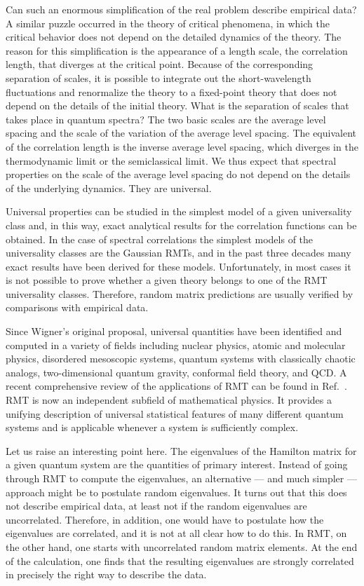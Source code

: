 Can such an enormous
simplification of the real problem describe
empirical data? A similar puzzle occurred in the theory of critical
phenomena, in which the critical behavior does not depend on the detailed
dynamics of the theory. The reason for this simplification is the
appearance of a length scale, the correlation length, that diverges
at the critical point.  Because of the corresponding separation of
scales, it is possible to integrate out the short-wavelength
fluctuations and renormalize the theory to a fixed-point theory that
does not depend on the details of the initial theory.  What is the
separation of scales that takes place in quantum spectra?  The two
basic scales are the average level spacing and the scale of the
variation of the average level spacing. The equivalent of the
correlation length is the inverse average level spacing, which diverges
in the thermodynamic limit or the semiclassical limit. We thus expect
that spectral properties on the scale of the average level spacing do
not depend on the details of the underlying dynamics. They are
universal.

Universal properties can be studied in the simplest model of a given
universality class and, in this way, exact analytical results for the
correlation functions can be obtained.  In the case of spectral
correlations the simplest models of the universality classes are the
Gaussian RMTs, and in the past three decades many
exact results have been derived for these models.  Unfortunately, in
most cases it is not possible to prove whether a given theory belongs
to one of the RMT universality classes.  Therefore,
random matrix predictions are usually verified by comparisons with
empirical data.

Since Wigner's original proposal, universal quantities have been
identified and computed in a variety of fields including nuclear
physics, atomic and molecular physics, disordered mesoscopic systems,
quantum systems with classically chaotic analogs, two-dimensional
quantum gravity, conformal field theory, and QCD.  A recent
comprehensive review of the applications of RMT can be found in
Ref.~\cite{Guhr98}.  RMT is now an independent subfield of
mathematical physics.  It provides a unifying description of universal
statistical features of many different quantum systems and is
applicable whenever a system is sufficiently complex.

Let us raise an interesting point here.
The eigenvalues of the Hamilton matrix for a given quantum
system are the quantities of primary interest.  Instead of going
through RMT to compute the eigenvalues, an 
alternative --- and much simpler --- approach might be to postulate
random eigenvalues.  It turns out that this does not describe
empirical data, at least not if the random eigenvalues are
uncorrelated.  Therefore, in addition, one would have to postulate how
the eigenvalues are correlated, and it is not at all clear how to do
this.  In RMT, on the other hand, one starts with
uncorrelated random matrix elements.  At the end of the calculation,
one finds that the resulting eigenvalues are strongly correlated in
precisely the right way to describe the data.

